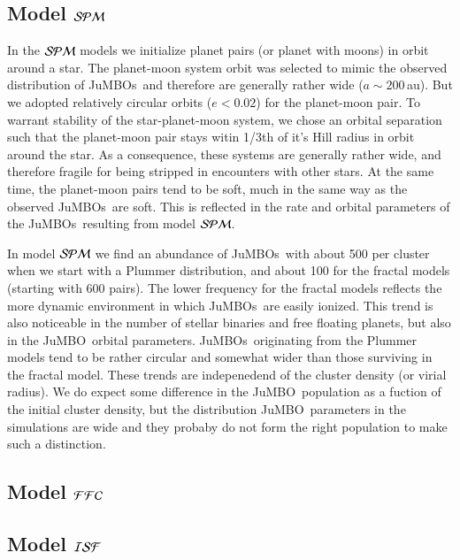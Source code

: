 \documentclass[aa]{lib/aa}
\newcommand{\jumbo}{\mbox{JuMBO}}
\newcommand{\jumbos}{\mbox{JuMBOs}}
\begin{document}
\subsection{Model ${\cal SPM}$}

In the ${\cal SPM}$ models we initialize planet pairs (or planet with
moons) in orbit around a star. The planet-moon system orbit was
selected to mimic the observed distribution of \jumbos\, and therefore
are generally rather wide ($a \sim 200$\,au). But we adopted
relatively circular orbits ($e<0.02$) for the planet-moon pair.  To
warrant stability of the star-planet-moon system, we chose an orbital
separation such that the planet-moon pair stays witin 1/3th of it's
Hill radius in orbit around the star. As a consequence, these systems
are generally rather wide, and therefore fragile for being stripped in
encounters with other stars. At the same time, the planet-moon pairs
tend to be soft, much in the same way as the observed \jumbos\, are
soft. This is reflected in the rate and orbital parameters of the
\jumbos\, resulting from model ${\cal SPM}$.

In model ${\cal SPM}$ we find an abundance of \jumbos\, with about 500
per cluster when we start with a Plummer distribution, and about 100
for the fractal models (starting with 600 pairs). The lower frequency
for the fractal models reflects the more dynamic environment in which
\jumbos\, are easily ionized. This trend is also noticeable in the
number of stellar binaries and free floating planets, but also in the
\jumbo\, orbital parameters. \jumbos\, originating from the Plummer
models tend to be rather circular and somewhat wider than those
surviving in the fractal model.  These trends are indepenedend of the
cluster density (or virial radius). We do expect some difference in
the \jumbo\, population as a fuction of the initial cluster density,
but the distribution \jumbo\, parameters in the simulations are wide
and they probaby do not form the right population to make such a
distinction.

\subsection{Model ${\cal FFC}$}


\subsection{Model ${\cal ISF}$}
\end{document}
